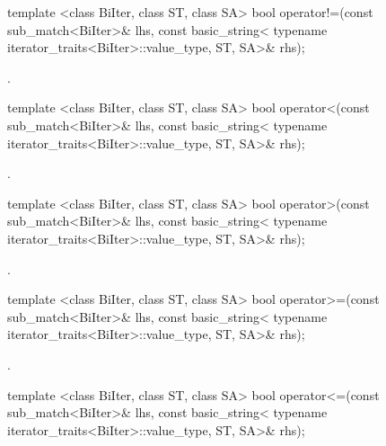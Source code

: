 %
%
\begin{itemdecl}
template <class BiIter, class ST, class SA>
  bool operator!=(const sub_match<BiIter>& lhs,
                  const basic_string<
                    typename iterator_traits<BiIter>::value_type, ST, SA>& rhs);
\end{itemdecl}

\begin{itemdescr}
\pnum\returns {}.
\end{itemdescr}

%
%
\begin{itemdecl}
template <class BiIter, class ST, class SA>
  bool operator<(const sub_match<BiIter>& lhs,
                 const basic_string<
                   typename iterator_traits<BiIter>::value_type, ST, SA>& rhs);
\end{itemdecl}

\begin{itemdescr}
\pnum\returns {}.
\end{itemdescr}

%
\begin{itemdecl}
template <class BiIter, class ST, class SA>
  bool operator>(const sub_match<BiIter>& lhs,
                 const basic_string<
                   typename iterator_traits<BiIter>::value_type, ST, SA>& rhs);
\end{itemdecl}

\begin{itemdescr}
\pnum\returns {}.
\end{itemdescr}

%
\begin{itemdecl}
template <class BiIter, class ST, class SA>
  bool operator>=(const sub_match<BiIter>& lhs,
                  const basic_string<
                    typename iterator_traits<BiIter>::value_type, ST, SA>& rhs);
\end{itemdecl}

\begin{itemdescr}
\pnum\returns {}.
\end{itemdescr}

%
\begin{itemdecl}
template <class BiIter, class ST, class SA>
  bool operator<=(const sub_match<BiIter>& lhs,
                  const basic_string<
                    typename iterator_traits<BiIter>::value_type, ST, SA>& rhs);
\end{itemdecl}

